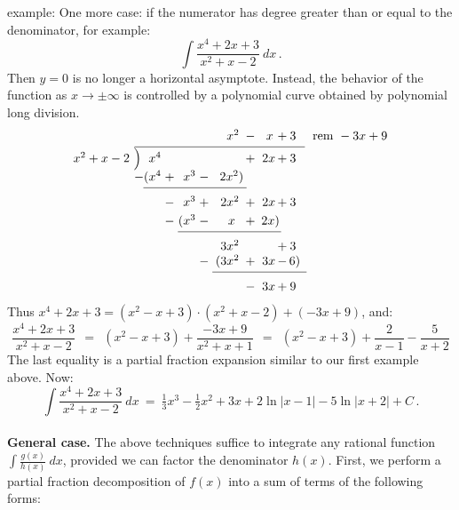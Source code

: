\documentclass[11pt]{article}
\newcommand{\ds}{\displaystyle}
\begin{document}
\noindent
{\sc example:} One more case: if the numerator has degree greater than or equal to the denominator, for example:
$$
\int\!\frac{x^4+2x+3}{x^2+x-2}\ dx\,.
$$
Then $y=0$ is no longer a horizontal asymptote. 
Instead, the behavior of the function as $x\to\pm\infty$ is
controlled by a polynomial curve obtained by polynomial long division.
$$\begin{array}{c@{\ }c@{\!}r@{\,}c@{\,}r@{\,}c@{\,}r@{\,}c@{\,}r@{\,}c@{\,}rc}
&&&&&&x^2&-&x\,&+&3 & \text{ rem } -3x + 9
\\[-.75em]
&&\underline{\hspace{1.9in}} \hspace{-1.60in}
\\[-.15em]
x^2+x-2 & \left)\vphantom{\ds\sum}\right. \!\!\!&\ \ \ x^4 & \ \ \ &\ \ \ &\ \ \ &\ \ \ &\ + \ &2x & + & 3
\\
&&\!-(x^4 & + & x^3 & - & 2x^2 )\!\!
\\[-.75em]
&&\underline{\hspace{1.15in}} \hspace{-.95in}
\\[.4em]
&&&-&x^3 & + &2x^2 & +  &2x & + & 3 
\\[.3em]
&&& - & \!\!(x^3 &-& x\ & +& 2x)\!\!
\\[-.75em]
&&&&\underline{\hspace{1.15in}} \hspace{-.95in}
\\[.4em]
&&&&&&3x^2&&&+&3
\\
&&&&&-& \!\!(3x^2&+&3x&-&6)\!\!
\\[-.75em]
&&&&&&\underline{\hspace{1.05in}} \hspace{-.75in}
\\[.4em]
&&&&&&&-&3x&+&9
\end{array}$$
Thus $x^4+2x+3 = (x^2{-}x{+}3){\cdot}(x^2{+}x{-}2) + (-3x{+}9)$, and:
$$
\frac{x^4+2x+3}{x^2+x-2} 
\ \ =\ \
(x^2{-}x{+}3) + \frac{-3x+9}{x^2+x+1}
\ \ =\ \
(x^2{-}x{+}3) + \frac{2}{x-1} - \frac{5}{x+2}
$$
The last equality is a partial fraction expansion similar to our first example above.
Now:
$$
\int\!\frac{x^4+2x+3}{x^2+x-2} \ dx
\ =\ 
\tfrac13 x^3{-}\tfrac12 x^2{+}3x + 2\ln\!|x{-}1| -  5\ln\!|x{+}2| + C\,.
$$
\\[0em]
{\bf General case.} The above techniques suffice to integrate any rational function
$\int \frac{g(x)}{h(x)}\ dx$, provided we can factor the denominator $h(x)$.
First, we perform a partial fraction decomposition of $f(x)$ into a sum of terms of the following forms:
\end{document}

